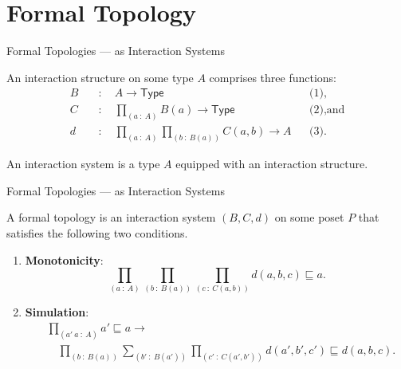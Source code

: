 \documentclass[xcolor={dvipsnames}]{beamer}
\newcommand{\pity}[3]{\prod_{(#1~:~#2)} #3}
\newcommand{\sigmaty}[3]{\sum_{(#1~:~#2)} #3}
\newcommand{\univ}{\mathsf{Type}}
\begin{document}
\section{Formal Topology}

\begin{frame}{Formal Topologies --- as Interaction Systems}
  \large

  An \alert{interaction structure} on some type $A$ comprises three functions:
  \begin{align*}
    B  &\quad:\quad A \rightarrow \univ{}                               && \text{(1)},           \\
    C  &\quad:\quad \pity{a}{A}{B(a) \rightarrow \univ{}}               && \text{(2)}, \text{and}\\
    d  &\quad:\quad \pity{a}{A}{\pity{b}{B(a)}{C(a, b) \rightarrow A}}  && \text{(3)}.
  \end{align*}

  An \alert{interaction system} is a type $A$ equipped with an interaction structure.
\end{frame}

\begin{frame}{Formal Topologies --- as Interaction Systems}
  \large

  A \alert{formal topology} is an interaction system $(B, C, d)$ on some poset $P$ that
  satisfies the following two conditions.

  \begin{enumerate}
    \item \textbf{Monotonicity}:
      \begin{equation*}
        \pity{a}{A}{\pity{b}{B(a)}{\pity{c}{C(a, b)}{d(a, b, c) \sqsubseteq a}}}.
      \end{equation*}
    \item \textbf{Simulation}:
      \begin{align*}
        &\pity{a'~a}{A}{
          a' \sqsubseteq a \rightarrow\\
            &\quad\pity{b}{B(a)}{%
              \sigmaty{b'}{B(a')}{
                \pity{c'}{C(a', b')}{
                  d(a', b', c') \sqsubseteq d(a, b, c)
                }
              }
            }
        }.
      \end{align*}
  \end{enumerate}
\end{frame}
\end{document}

